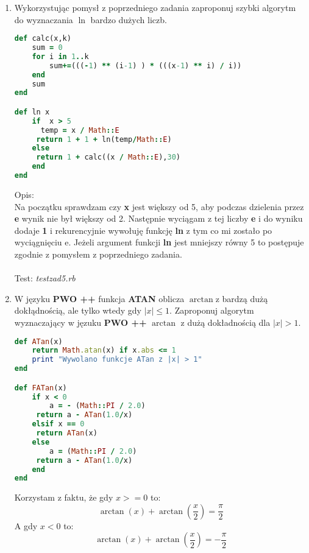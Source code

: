 \documentclass[fleqn]{article}
\begin{document}
\begin{enumerate}
  
 \item Wykorzystując pomysł z poprzedniego zadania zaproponuj szybki algorytm do wyznaczania $ \ln $ bardzo dużych liczb.\\
 \begin{lstlisting}[language=Ruby, caption=Algorytm do wyznacznia logarytmu naturalnego]
def calc(x,k)
    sum = 0 
    for i in 1..k 
        sum+=(((-1) ** (i-1) ) * (((x-1) ** i) / i))
    end
    sum
end

def ln x
    if  x > 5
      temp = x / Math::E 
     return 1 + 1 + ln(temp/Math::E)
    else
     return 1 + calc((x / Math::E),30)
    end 
end

\end{lstlisting}
Opis:\\

Na początku sprawdzam czy \textbf{x} jest większy od 5, aby podczas dzielenia przez \textbf{e} wynik nie był większy od 2. Następnie wyciągam z tej liczby \textbf{e} i  do wyniku dodaje \textbf{1} i rekurencyjnie wywołuję funkcję \textbf{ln} z tym co mi zostało po wyciągnięciu e. Jeżeli argument funkcji \textbf{ln} jest mniejszy równy 5 to postępuje zgodnie z pomysłem z poprzedniego zadania.\\ \\
Test: \emph{testzad5.rb}\\

\item W języku \textbf{PWO ++} funkcja \textbf{ATAN} oblicza $ \arctan$z bardzą dużą dokłądnością, ale tylko wtedy gdy $ |x| \leq 1 $. Zaproponuj algorytm wyznaczający w jęzuku  \textbf{PWO ++} $ \arctan $ z dużą dokładnością dla $ |x| > 1 $.
 \begin{lstlisting}[language=Ruby, caption= Kod w Ruby]
def ATan(x)
    return Math.atan(x) if x.abs <= 1
    print "Wywolano funkcje ATan z |x| > 1"
end

def FATan(x)
    if x < 0
        a = - (Math::PI / 2.0)
     return a - ATan(1.0/x)
    elsif x == 0
     return ATan(x)
    else
        a = (Math::PI / 2.0)
     return a - ATan(1.0/x)
    end
end

\end{lstlisting}
Korzystam z faktu, że gdy $ x >= 0 $ to:
\[\arctan(x) + \arctan(\frac{x}{2}) =\frac{\pi}{2}\]
A gdy $ x < 0 $ to:
\[\arctan(x) + \arctan(\frac{x}{2}) =-\frac{\pi}{2}\]
 \end{enumerate}
\end{document}
